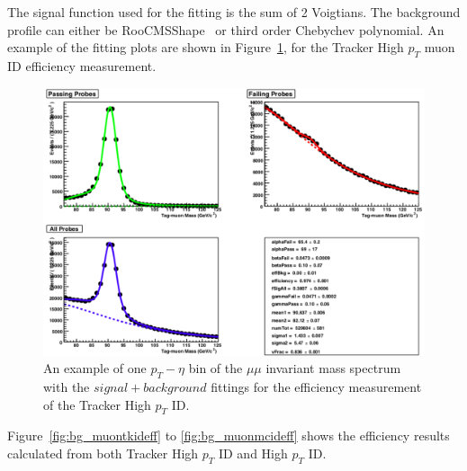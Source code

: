 \vspace{0.3cm}
The signal function used for the fitting is the sum of 2 Voigtians. The background profile can either be RooCMSShape~\cite{bg_cmsshape} or third order Chebychev polynomial. An example of the fitting plots are shown in Figure~\ref{fig:bg_tnpmuonid}, for the Tracker High $p_T$ muon ID efficiency measurement.
\begin{figure}[htbp]
\begin{center}
\includegraphics[width=0.9\linewidth]{figures/bg_tnpmuonid.png}
\caption{An example of one $p_T - \eta$ bin of the $\mu\mu$ invariant mass spectrum with the $signal+background$ fittings for the efficiency measurement of the Tracker High $p_T$ ID.}
\label{fig:bg_tnpmuonid}
\end{center}
\end{figure}

\vspace{0.3cm}
Figure~\ref{fig:bg_muontkideff} to \ref{fig:bg_muonmcideff} shows the efficiency results calculated from both Tracker High $p_T$ ID and High $p_T$ ID.

